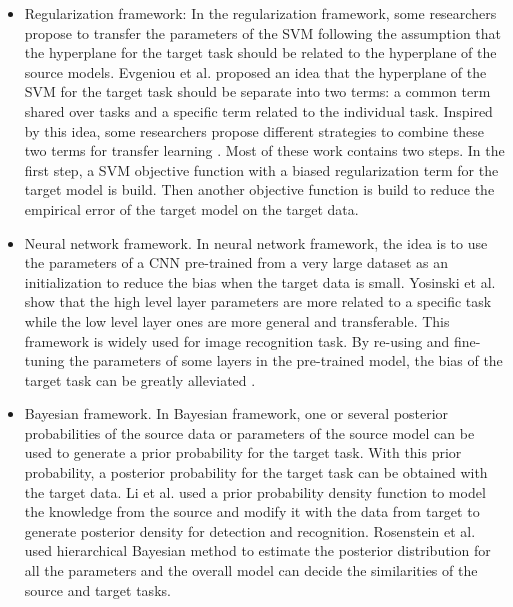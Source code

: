 \begin{itemize}
	\item Regularization framework: In the regularization framework, some researchers propose to transfer the parameters of the SVM following the assumption that the hyperplane for the target task should be related to the hyperplane of the source models. Evgeniou et al. \cite{evgeniou2004regularized} proposed an idea that the hyperplane of the SVM for the target task should be separate into two terms: a common term shared over tasks and a specific term related to the individual task. Inspired by this idea, some researchers propose different strategies to combine these two terms for transfer learning \cite{aytar2011tabula} \cite{tommasi2010safety} \cite{yang2007cross}. Most of these work contains two steps. In the first step, a SVM objective function with a biased regularization term for the target model is build. Then another objective function is build to reduce the empirical error of the target model on the target data.
	\item Neural network framework. In neural network framework, the idea is to use the parameters of a CNN pre-trained from a very large dataset as an initialization to reduce the bias when the target data is small. Yosinski et al. \cite{yosinski2014transferable} show that the high level layer parameters are more related to a specific task while the low level layer ones are more general and transferable. This framework is widely used for image recognition task. By re-using and fine-tuning the parameters of some layers in the pre-trained model, the bias of the target task can be greatly alleviated \cite{Chatfield14} \cite{hoffman2013one}  \cite{zeiler2014visualizing} \cite{NIPS2014_Zhou}. 
	\item Bayesian framework. In Bayesian framework, one or several posterior probabilities of the source data or parameters of the source model can be used to generate a prior probability for the target task. With this prior probability, a posterior probability for the target task can be obtained with the target data.
	Li et al. \cite{fei2006one} used a prior probability density function to model the knowledge from the source and modify it with the data from target to generate posterior density for detection and recognition. 
	Rosenstein et al. \cite{rosenstein2005transfer} used hierarchical Bayesian method to estimate the posterior distribution for all the parameters and the overall model can decide the similarities of the source and target tasks. 
\end{itemize}

